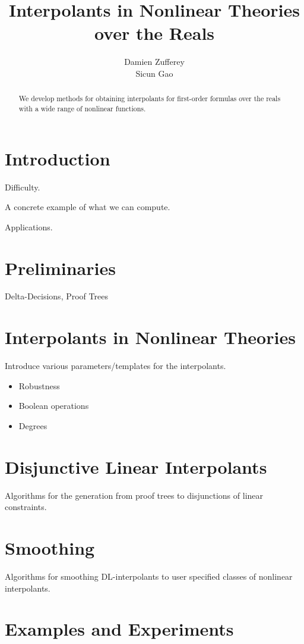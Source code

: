 \documentclass{acm_proc_article-sp}
\begin{document}
\title{Interpolants in Nonlinear Theories over the Reals}
\author{
\alignauthor
Damien Zufferey\\
\alignauthor
Sicun Gao
}
\maketitle
\begin{abstract}
We develop methods for obtaining interpolants for first-order formulas over the reals with a wide range of nonlinear functions. 
\end{abstract}

\section{Introduction}

Difficulty. 

A concrete example of what we can compute. 

Applications. 

\section{Preliminaries}

Delta-Decisions, Proof Trees

\section{Interpolants in Nonlinear Theories}

Introduce various parameters/templates for the interpolants. 
\begin{itemize}
	\item Robustness
	\item Boolean operations
	\item Degrees 
\end{itemize}

\section{Disjunctive Linear Interpolants}

Algorithms for the generation from proof trees to disjunctions of linear constraints. 

\section{Smoothing}

Algorithms for smoothing DL-interpolants to user specified classes of nonlinear interpolants. 


\section{Examples and Experiments}
\end{document}
